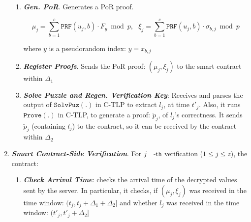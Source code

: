 \begin{enumerate}[leftmargin=.46cm]
\begin{enumerate}
\item\label{Gen-PoR}\textbf{\textit{\small {Gen. PoR}}}. Generates a PoR proof. 

$$\mu_{\scriptscriptstyle j}=\sum\limits^{\scriptscriptstyle c}_{\scriptscriptstyle b=1}  \mathtt{PRF}(u_{\scriptscriptstyle j},b)\cdot F_{\scriptscriptstyle y}\bmod p, \  \  \ \xi_{\scriptscriptstyle j}= \sum\limits^{\scriptscriptstyle c}_{\scriptscriptstyle b=1}  \mathtt{PRF}(u_{\scriptscriptstyle j},b)\cdot \sigma_{\scriptscriptstyle b,j}\bmod p$$
 
 where  $y$ is a pseudorandom index: $y= x_{\scriptscriptstyle b,j}$ %
 
 \item\label{Register-Proofs}\textbf{\textit{\small {Register Proofs}}}.  Sends the PoR proof: $(\mu_{\scriptscriptstyle j},\xi_{\scriptscriptstyle j})$   to the smart contract within  $\Delta_{\scriptscriptstyle1}$
 \item\label{fully-recover-l}\textbf{\textit{\small {Solve Puzzle and Regen.  Verification Key}}}: Receives and parses the output of $\mathtt{SolvPuz}(.)$ in C-TLP to extract $l_{\scriptscriptstyle j}$, at time $t'_{\scriptscriptstyle j}$. Also, it runs $\mathtt{Prove}(.)$ in C-TLP, to generate a proof: $\ddot{p}_{\scriptscriptstyle j}$, of $l_{\scriptscriptstyle j}$'s correctness. It sends $\ddot{p}_{\scriptscriptstyle j}$ (containing $l_{\scriptscriptstyle j}$)  to the contract, so it can be received by the contract within $\Delta_{\scriptscriptstyle 2}$ 
\end{enumerate}


\item \textit{\textbf{Smart Contract-Side Verification}}. For   $j\text{\small{-th}}$ verification  ($1\leq j\leq z$), the contract:



\begin{enumerate} 
\item\textbf{\textit{\small {Check Arrival Time}}}: checks the arrival time of the decrypted values sent by the server. In particular, it checks, if $(\mu_{\scriptscriptstyle j},\xi_{\scriptscriptstyle j})$ was received in the time window: $(t_{\scriptscriptstyle j}, t_{\scriptscriptstyle j}+\Delta_{\scriptscriptstyle 1}+\Delta_{\scriptscriptstyle 2}]$ and whether $l_{\scriptscriptstyle j}$ was received in the time window: $(t'_{\scriptscriptstyle j}, t'_{\scriptscriptstyle j}+\Delta_{\scriptscriptstyle 2}]$


\end{enumerate}
\end{enumerate}
